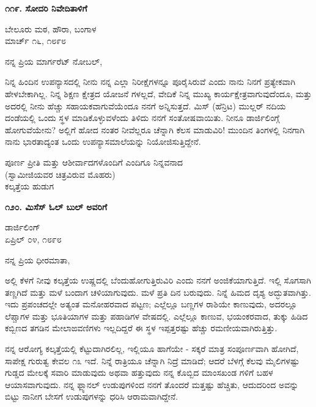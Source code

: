 \begin{center}
\textbf{೧೧೯. ಸೋದರಿ ನಿವೇದಿತಾಳಿಗೆ}
\end{center}

\begin{flushright}
ಬೇಲೂರು ಮಠ, ಹೌರಾ, ಬಂಗಾಳ\\ಮಾರ್ಚ್ ೧೬, ೧೮೯೮
\end{flushright}

ನನ್ನ ಪ್ರಿಯ ಮಾರ್ಗರೆಟ್ ನೋಬಲ್,

ನಿನ್ನ ಹಿಂದಿನ ಉಪನ್ಯಾಸದಲ್ಲಿ ನೀನು ನನ್ನ ಎಲ್ಲಾ ನಿರೀಕ್ಷೆಗಳನ್ನೂ ಪೂರೈಸಿರುವೆ ಎಂದು ನಾನು ನಿನಗೆ ಪ್ರತ್ಯೇಕವಾಗಿ ಹೇಳಬೇಕಾಗಿಲ್ಲ. ನಿನ್ನ ಶಿಕ್ಷಣ ಕ್ಷೇತ್ರದ ಯೋಜನೆ ಗಳಲ್ಲದೆ, ವೇದಿಕೆ ನಿನ್ನ ಮುಖ್ಯ ಕಾರ್ಯಕ್ಷೇತ್ರವಾಗುವುದೆಂದೂ, ಮತ್ತು ಅದರಲ್ಲಿ ನೀನು ಹೆಚ್ಚು ಸಹಾಯಕವಾಗುವೆಯೆಂದೂ ನನಗೆ ಅನ್ನಿಸುತ್ತದೆ. ಮಿಸ್ (ಹೆನ್ರಿಟ) ಮುಲ್ಲರ್ ನದಿಯ ದಂಡೆಯಲ್ಲಿ ಒಂದು ಸ್ಥಳ ಮಾಡಿಕೊಳ್ಳುವಳೆಂದು ತಿಳಿದು ನನಗೆ ಸಂತೋಷವಾಯಿತು. ನೀನೂ ಡಾರ್ಜಿಲಿಂಗ್ಗೆ ಹೋಗುವೆಯೇನು? ಅಲ್ಲಿಗೆ ಹೋದ ನಂತರ ನೀವೆಲ್ಲರೂ ಚೆನ್ನಾಗಿ ಕೆಲಸ ಮಾಡುವಿರಿ! ಮುಂದಿನ ತಿಂಗಳಲ್ಲಿ ನಿನಗಾಗಿ ನಾನು ಭಾರತಾದ್ಯಂತ ಒಂದು ಉಪನ್ಯಾಸಮಾಲೆಯನ್ನು ನಿಯೋಜಿಸುತ್ತಿದ್ದೇನೆ.

\begin{flushright}
ಪೂರ್ಣ ಪ್ರೀತಿ ಮತ್ತು ಆಶೀರ್ವಾದಗಳೊಂದಿಗೆ ಎಂದಿಗೂ ನಿನ್ನವನಾದ\\(ಸ್ವಾಮೀಜಿಯವರ ಚಿತ್ರವಿರುವ ಮೊಹರು)\\ಕಲ್ಕತ್ತೆಯ ಹುಡುಗ
\end{flushright}

\begin{center}
\textbf{೧೨೦. ಮಿಸೆಸ್ ಓಲ್ ಬುಲ್ ಅವರಿಗೆ}
\end{center}

\begin{flushright}
ಡಾರ್ಜಿಲಿಂಗ್\\ಏಪ್ರಿಲ್ ೦೪, ೧೮೯೮
\end{flushright}

ನನ್ನ ಪ್ರಿಯ ಧೀರಮಾತಾ,

ಅಲ್ಲಿ ಕೆಳಗೆ ನೀವು ಕಲ್ಕತ್ತೆಯ ಉಷ್ಣದಲ್ಲಿ ಬೆಂದುಹೋಗುತ್ತಿರುವಿರಿ ಎಂದು ನನಗೆ ಅಂಜಿಕೆಯಾಗುತ್ತಿದೆ. ಇಲ್ಲಿ ಸೊಗಸಾಗಿ ತಣ್ಣಗಿದೆ ಮತ್ತು ಮಳೆ ಬಂದಾಗ ಚಳಿಯಾಗುವುದು. ಮಳೆ ಪ್ರತಿ ದಿನ ಬರುವುದು. ನಿನ್ನೆ ಹಿಮದ ದೃಶ್ಯ ಅದ್ಭುತವಾಗಿತ್ತು. ಇದು ಪ್ರಪಂಚದಲ್ಲೇ ಅತ್ಯಂತ ಮನೋಹರವಾದ ಪಟ್ಟಣ; ಎಲ್ಲೆಲ್ಲೂ ಬಣ್ಣಗಳ ರಾಶಿಯೇ ಕಾಣುವುದು, ಅದರಲ್ಲೂ ಲೆಪ್ಚಾಗಳ ಮತ್ತು ಭೂತಿಯಾಗಳ ಮತ್ತು ಪಹಾಡಿಗಳ ವೇಷದಲ್ಲಿ. ಎಲ್ಲೆಲ್ಲೂ ಕಾಣುವ, ಭಯಂಕರವಾದ, ತುಕ್ಕು ಹಿಡಿದ ಕಬ್ಬಿಣದ ತಗಡಿನ ಮೇಲಾಙವಣಿಗಳು ಇಲ್ಲದಿದ್ದರೆ ಈ ಸ್ಥಳ ಇಪ್ಪತ್ತರಷ್ಟು ಹೆಚ್ಚು ರಮಣೀಯವಾಗಿರುತ್ತಿತ್ತು.

ನನ್ನ ಆರೋಗ್ಯ ಕಲ್ಕತ್ತೆಯಲ್ಲಿ ಕೆಟ್ಟುದಾಗಿರಲಿಲ್ಲ, ಇಲ್ಲಿಯೂ ಹಾಗೆಯೇ - ಸಕ್ಕರೆ ಮಾತ್ರ ಸಂಪೂರ್ಣವಾಗಿ ಹೋಗಿದೆ, ಸಾಪೇಕ್ಷ ಗುರುತ್ವ ಕೇವಲ ೧೩ ಇದೆ. ನಿನ್ನೆ ರಾತ್ರಿಯೂ ಚೆನ್ನಾಗಿ ನಿದ್ರೆ ಮಾಡಿದೆ; ಆದರೆ ಬೆಳಗ್ಗೆ ಕೆಲವು ಮೈಲಿಗಳಷ್ಟು ಗುಡ್ಡದ ಮೇಲಕ್ಕೆ ಸವಾರಿ ಮಾಡುವುದು ಅಥವಾ ಹತ್ತುವುದು ನನ್ನ ಕೊಬ್ಬಿದ ಮಾಂಸಖಂಡ ಗಳಿಗೆ ಬಹಳ ಆಯಾಸವಾಗುವುದು. ನನ್ನ ಫ್ಲ್ಯಾನಲ್ ಉಡುಪುಗಳಿಂದ ನನಗೆ ತೊಂದರೆ ಮತ್ತಷ್ಟು ಹೆಚ್ಚಿತು, ಆದುದರಿಂದ ಅವನ್ನು ಬಿಟ್ಟು ನಾನೀಗ ಬೇಸಗೆ ಉಡುಪುಗಳನ್ನು ಧರಿಸಿ ಆರಾಮವಾಗಿದ್ದೇನೆ.

